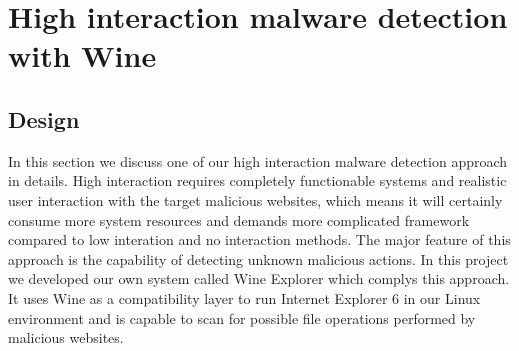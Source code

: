 \section{High interaction malware detection with Wine}
\subsection{Design}
In this section we discuss one of our high interaction malware detection 
approach in details. High interaction requires completely functionable systems 
and realistic user interaction with the target malicious websites, which means 
it will certainly consume more system resources and demands more complicated 
framework compared to low interation and no interaction methods. The major 
feature of this approach is the capability of detecting unknown malicious 
actions. In this project we developed our own system called Wine Explorer 
which complys this approach. It uses Wine as a compatibility layer to run 
Internet Explorer 6 in our Linux environment and is capable to scan for 
possible file operations performed by malicious websites. 

